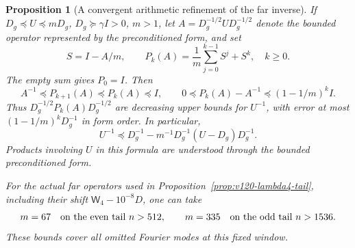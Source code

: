 \documentclass[11pt]{article}
\newtheorem{proposition}[theorem]{Proposition}
\theoremstyle{remark}
\begin{document}
\begin{proposition}[A convergent arithmetic refinement of the far inverse]
\label{prop:v120-inverse-polynomial}
If $D_g\preceq U\preceq mD_g$, $D_g\succeq\gamma I>0$,
$m>1$, let $A=D_g^{-1/2}UD_g^{-1/2}$ denote the bounded
operator represented by the preconditioned form, and set
\[
 S=I-A/m,\qquad
 P_k(A)=\frac1m\sum_{j=0}^{k-1}S^j+S^k,\quad k\ge0.
\]
The empty sum gives $P_0=I$. Then
\begin{equation}\label{eq:v120-inverse-polynomial}
 A^{-1}\preceq P_{k+1}(A)\preceq P_k(A)\preceq I,
 \qquad
 0\preceq P_k(A)-A^{-1}\preceq(1-1/m)^k I.
\end{equation}
Thus $D_g^{-1/2}P_k(A)D_g^{-1/2}$ are decreasing upper
bounds for $U^{-1}$, with error at most
$(1-1/m)^kD_g^{-1}$ in form order. In particular,
\begin{equation}\label{eq:v120-first-inverse-refinement}
 U^{-1}\preceq D_g^{-1}
       -m^{-1}D_g^{-1}(U-D_g)D_g^{-1}.
\end{equation}
Products involving $U$ in this formula are understood through the
bounded preconditioned form.

For the actual far operators used in
Proposition~\ref{prop:v120-lambda4-tail}, including their shift
$\mathsf W_4-10^{-8}D$, one can take
\[
 m=67\quad\hbox{on the even tail }n>512,\qquad
 m=335\quad\hbox{on the odd tail }n>1536.
\]
These bounds cover all omitted Fourier modes at this fixed window.
\end{proposition}
\end{document}
